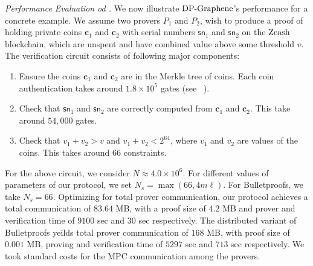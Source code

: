{\em Performance Evaluation od \dpname.}
We now illustrate $\text{DP-Graphene}$'s performance for a concrete example. We assume two
provers $P_1$ and $P_2$, wish to produce a proof of holding private coins
$\bm{c}_1$ and $\bm{c}_2$ with serial
numbers $\mathsf{sn}_1$ and $\mathsf{sn}_2$ on the $\mathrm{Zcash}$ blockchain, which
are unspent and have combined value above some threshold $v$. The verification
circuit consists of following major components:
\begin{enumerate}
\item Ensure the coins $\bm{c}_1$ and $\bm{c}_2$ are in the Merkle tree of
coins. Each coin authentication takes around $1.8\times 10^5$ gates (see
~\cite[Section 5.2.2]{zerocashext}).
\item Check that $\mathsf{sn}_1$ and $\mathsf{sn}_2$ are correctly computed from 
$\bm{c}_1$ and $\bm{c}_2$. This take around $54,000$ gates.
\item Check that $v_1+v_2>v$ and $v_1+v_2 < 2^{64}$, where $v_1$ and $v_2$ are
values of the coins. This takes around 66 constraints.
\end{enumerate}
For the above circuit, we consider $N\approx 4.0\times 10^6$. For different
values of parameters of our protocol, we set $N_s=\max(66,4m\ell)$.
For Bulletproofs, we take $N_s=66$. Optimizing for total prover communication, our
protocol achieves a total communication of $83.64$ MB, with a proof size of
$4.2$ MB and prover and verification time of $9100$ sec and $30$ sec
respectively. The distributed variant of Bulletproofs yeilds total prover
communication of $168$ MB, with proof size of $0.001$ MB, proving and
verification time of $5297$ sec and $713$ sec respectively. We took standard
costs for the MPC communication among the provers. 
